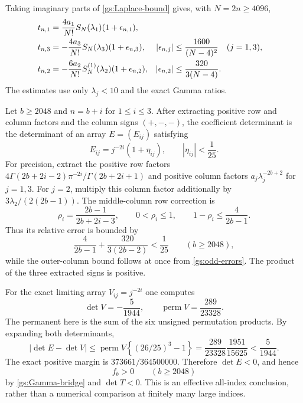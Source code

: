 \documentclass[11pt,a4paper]{article}
\theoremstyle{definition}
\theoremstyle{remark}
\numberwithin{equation}{section}
\begin{document}
Taking imaginary parts of \eqref{gs:Laplace-bound} gives, with
$N=2n\ge4096$,
\begin{align}
 t_{n,1}&=\frac{4a_1}{N!}S_N(\lambda_1)(1+\epsilon_{n,1}),\notag\\
 t_{n,3}&=-\frac{4a_3}{N!}S_N(\lambda_3)(1+\epsilon_{n,3}),
 &|\epsilon_{n,j}|&\le\frac{1600}{(N-4)^2}\quad(j=1,3),
 \label{gs:odd-errors}\\
 t_{n,2}&=-\frac{6a_2}{N!}S_N^{(1)}(\lambda_2)(1+\epsilon_{n,2}),
 &|\epsilon_{n,2}|&\le\frac{320}{3(N-4)}.
 \label{gs:even-error}
\end{align}
The estimates use only $\lambda_j<10$ and the exact Gamma ratios.

Let $b\ge2048$ and $n=b+i$ for $1\le i\le3$.
After extracting positive row and column factors and the column
signs $(+,-,-)$, the coefficient determinant is the determinant of
an array $E=(E_{ij})$ satisfying
\begin{equation}\label{gs:relative-matrix}
 E_{ij}=j^{-2i}(1+\eta_{ij}),\qquad |\eta_{ij}|<\frac1{25}.
\end{equation}
For precision, extract the positive row factors
$4\Gamma(2b+2i-2)\pi^{-2i}/\Gamma(2b+2i+1)$ and positive column
factors $a_j\lambda_j^{-2b+2}$ for $j=1,3$.
For $j=2$, multiply this column factor additionally by
$3\lambda_2/(2(2b-1))$.
The middle-column row correction is
\[
 \rho_i=\frac{2b-1}{2b+2i-3},\qquad
 0<\rho_i\le1,\qquad1-\rho_i\le\frac4{2b-1}.
\]
Thus its relative error is bounded by
\[
 \frac4{2b-1}+\frac{320}{3(2b-2)}<\frac1{25}\qquad(b\ge2048),
\]
while the outer-column bound follows at once from
\eqref{gs:odd-errors}.  The product of the three extracted signs is
positive.

For the exact limiting array $V_{ij}=j^{-2i}$ one computes
\begin{equation}\label{gs:V}
 \det V=-\frac5{1944},\qquad
 \operatorname{perm}V=\frac{289}{23328}.
\end{equation}
The permanent here is the sum of the six unsigned permutation
products.  By expanding both determinants,
\[
 |\det E-\det V|
 \le\operatorname{perm}V\left\{(26/25)^3-1\right\}
 =\frac{289}{23328}\frac{1951}{15625}<\frac5{1944}.
\]
The exact positive margin is $373661/364500000$.
Therefore $\det E<0$, and hence
\begin{equation}\label{gs:large-positive}
                         f_b>0\qquad(b\ge2048)
\end{equation}
by \eqref{gs:Gamma-bridge} and $\det T<0$.
This is an effective all-index conclusion, rather than a numerical
comparison at finitely many large indices.
\end{document}
